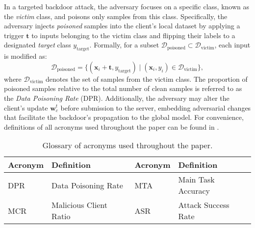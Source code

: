 In a targeted backdoor attack, the adversary focuses on a specific class, known as the \textit{victim} class, and poisons only samples from this class. Specifically, the adversary injects \textit{poisoned} samples into the client’s local dataset by applying a trigger \(\mathbf{t}\) to inputs belonging to the victim class and flipping their labels to a designated \textit{target} class \(y_{\text{target}}\). Formally, for a subset \(\mathcal{D}_{\text{poisoned}} \subset \mathcal{D}_{\text{victim}}\), each input is modified as:
\begin{equation}
    \mathcal{D}_{\text{poisoned}} = \{(\mathbf{x}_i + \mathbf{t}, y_{\text{target}}) \mid (\mathbf{x}_i, y_i) \in \mathcal{D}_{\text{victim}}\},
\end{equation}
where \(\mathcal{D}_{\text{victim}}\) denotes the set of samples from the victim class.
%
The proportion of poisoned samples relative to the total number of clean samples is referred to as the \textit{Data Poisoning Rate} (DPR). Additionally, the adversary may alter the client's update \(\mathbf{w}_c^t\) before submission to the server, embedding adversarial changes that facilitate the backdoor's propagation to the global model. For convenience, definitions of all acronyms used throughout the paper can be found in .



\begin{table}[ht]
    \footnotesize
    \centering
    \begin{tabular}{ll|ll}
    \toprule
    \textbf{Acronym} & \textbf{Definition} & \textbf{Acronym} & \textbf{Definition} \\
    \midrule
    DPR & Data Poisoning Rate & MTA & Main Task Accuracy \\
    MCR & Malicious Client Ratio & ASR & Attack Success Rate \\
    \bottomrule
    \end{tabular}
    \caption{Glossary of acronyms used throughout the paper.}
    \label{tab:glossary}
\end{table}
